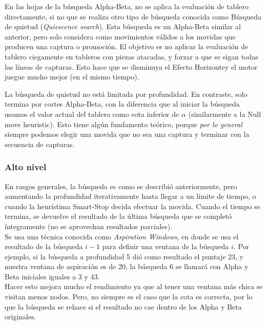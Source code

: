 \documentclass{article}
\begin{document}
\begin{multicols}{2}
En las hojas de la búsqueda Alpha-Beta, no se aplica la evaluación
de tablero directamente, si no que se realiza otro tipo de búsqueda
conocida como Búsqueda de quietud (\emph{Quiescence search}). Esta
búsqueda es un Alpha-Beta similar al anterior, pero solo considera
como movimientos válidos a los movidas que producen una captura
o promoción. El objetivo es no aplicar la evaluación de tablero
ciegamente en tableros con piezas atacadas, y forzar a que se sigan
todas las líneas de capturas. Esto hace que se disminuya el Efecto
Horizonte\footnotemark y el motor juegue mucho mejor (en el mismo tiempo).
\\


La búsqueda de quietud no está limitada por profundidad. En contraste,
solo termina por cortes Alpha-Beta, con la diferencia que al iniciar
la búsqueda usamos el valor actual del tablero como cota inferior de
$\alpha$ (similarmente a la Null move heuristic). Esto tiene algún
fundamento teórico, porque \emph{por lo general} siempre podemos
elegir una movida que no sea una captura y terminar con la secuencia de
capturas.
\\

\subsubsection{Alto nivel}

En rasgos generales, la búsqueda es como se describió anteriormente,
pero aumentando la profundidad iterativamente hasta llegar a un límite
de tiempo, o cuando la heurístima Smart-Stop decida efectuar la movida.
Cuando el tiempo se termina, se devuelve el resultado de la última
búsqueda que se completó íntegramente (no se aprovechan resultados
parciales).
\\

Se usa una técnica conocida como \emph{Aspiration Windows}, en donde se
usa el resultado de la búsqueda $i - 1$ para definir una ventana de la
búsqueda $i$. Por ejemplo, si la búsqueda a profundidad 5 dió como
resultado el puntaje 23, y nuestra ventana de aspiración es de 20, la
búsqueda 6 se llamará con Alpha y Beta iniciales iguales a 3 y 43.
\\

Hacer esto mejora mucho el rendimiento ya que al tener una ventana más
chica se visitan menos nodos. Pero, no siempre es el caso que la cota
es correcta, por lo que la búsqueda se rehace si el resultado no cae
dentro de los Alpha y Beta originales.


\end{multicols}
\end{document}
